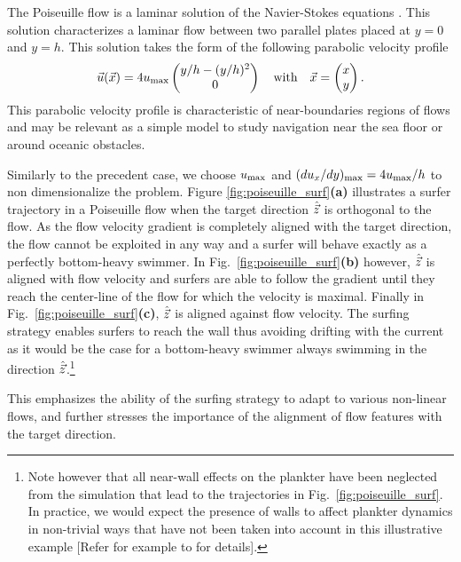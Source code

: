 The Poiseuille flow is a laminar solution of the Navier-Stokes equations \citep{poiseuille1844recherches}.
This solution characterizes a laminar flow between two parallel plates placed at $y=0$ and $y=h$.
This solution takes the form of the following parabolic velocity profile
\begin{equation}
	\vec{u}(\vec{x}) = 4 u_{\mathrm{max}}
	\begin{pmatrix}
		y/h - (y/h)^2 \\
		0
	\end{pmatrix}
	\quad \text{with} \quad
	\vec{x} =
	\begin{pmatrix}
		x \\
		y
	\end{pmatrix}.
\end{equation}
This parabolic velocity profile is characteristic of near-boundaries regions of flows and may be relevant as a simple model to study navigation near the sea floor or around oceanic obstacles.

Similarly to the precedent case, we choose $u_{\mathrm{max}}$ and $(d u_x / dy)_{\mathrm{max}} = 4 u_{\mathrm{max}} / h$ to non dimensionalize the problem.
Figure \ref{fig:poiseuille_surf}\textbf{(a)} illustrates a surfer trajectory in a Poiseuille flow when the target direction $\hat{\vec{z}}$ is orthogonal to the flow.
As the flow velocity gradient is completely aligned with the target direction, the flow cannot be exploited in any way and a surfer will behave exactly as a perfectly bottom-heavy swimmer.
In Fig.~\ref{fig:poiseuille_surf}\textbf{(b)} however, $\hat{\vec{z}}$ is aligned with flow velocity and surfers are able to follow the gradient until they reach the center-line of the flow for which the velocity is maximal.
Finally in Fig.~\ref{fig:poiseuille_surf}\textbf{(c)}, $\hat{\vec{z}}$ is aligned against flow velocity. 
The surfing strategy enables surfers to reach the wall thus avoiding drifting with the current as it would be the case for a bottom-heavy swimmer always swimming in the direction $\hat{\vec{z}}$.\footnote{Note however that all near-wall effects on the plankter have been neglected from the simulation that lead to the trajectories in Fig.~\ref{fig:poiseuille_surf}.
In practice, we would expect the presence of walls to affect plankter dynamics in non-trivial ways that have not been taken into account in this illustrative example [Refer for example to \citet{zottl2012nonlinear} for details].}

This emphasizes the ability of the surfing strategy to adapt to various non-linear flows, and further stresses the importance of the alignment of flow features with the target direction.

